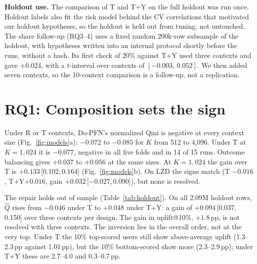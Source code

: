 \documentclass[sigconf,anonymous,review]{acmart}
\DeclareRobustCommand{\dopfn}{\mbox{Do-PFN}\xspace}
\newcommand{\Qhat}{\ensuremath{\hat Q}\xspace}
\newcommand{\TY}{T+Y\xspace}
\newcommand{\pp}{\,pp\xspace}
\newcommand{\ci}[2]{\,[#1,\,#2]}
\begin{document}
\textbf{Holdout use.} The comparison of T and \TY on the full holdout was run once. Holdout labels also fit the risk model behind the CV correlations that motivated our holdout hypotheses, so the holdout is held out from tuning, not untouched. The share follow-up (RQ3--4) uses a fixed random 200k-row subsample of the holdout, with hypotheses written into an internal protocol shortly before the runs, without a hash. Its first check of 20\% against \TY used three contexts and gave $+0.024$, with a $t$-interval over contexts of $[-0.003,\,0.052]$. We then added seven contexts, so the 10-context comparison is a follow-up, not a replication.

\section{RQ1: Composition sets the sign}

Under R or T contexts, \dopfn's normalized Qini is negative at every context size (Fig.~\ref{fig:models}a): $-0.072$ to $-0.085$ for $K$ from 512 to 4,096. Under T at $K{=}1{,}024$ it is $-0.077$, negative in all five folds and in 14 of 15 runs. Outcome balancing gives $+0.037$ to $+0.056$ at the same sizes. At $K{=}1{,}024$ the gain over T is $+0.133$\ci{0.102}{0.164} (Fig.~\ref{fig:models}b). On LZD the signs match (T $-0.016$, \TY $+0.016$, gain $+0.032$\ci{$-$0.027}{0.090}), but none is resolved.

The repair holds out of sample (\mbox{Table}~\ref{tab:holdout}). On all 2.09M holdout rows, \Qhat rises from $-0.046$ under T to $+0.048$ under \TY: a gain of $+0.094$\ci{0.037}{0.150} over three contexts per design. The gain in uplift@10\%, $+1.8$\pp, is not resolved with three contexts. The inversion lies in the overall order, not at the very top. Under T the 10\% top-scored users still show above-average uplift (1.3--2.3\pp against 1.01\pp), but the 10\% bottom-scored show more (2.3--2.9\pp); under \TY these are 2.7--4.0 and 0.3--0.7\pp.
\end{document}
